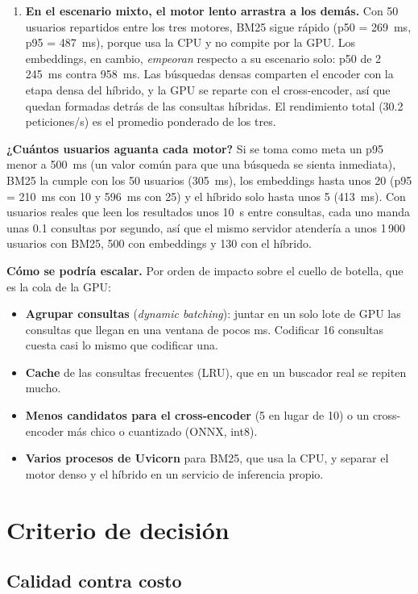 \documentclass[11pt,letterpaper]{article}
\begin{document}
\begin{enumerate}
\item \textbf{En el escenario mixto, el motor lento arrastra a los demás.} Con 50 usuarios repartidos entre los tres motores, BM25 sigue rápido (p50 = 269~ms, p95 = 487~ms), porque usa la CPU y no compite por la GPU. Los embeddings, en cambio, \emph{empeoran} respecto a su escenario solo: p50 de 2\,245~ms contra 958~ms. Las búsquedas densas comparten el encoder con la etapa densa del híbrido, y la GPU se reparte con el cross-encoder, así que quedan formadas detrás de las consultas híbridas. El rendimiento total (30.2 peticiones/s) es el promedio ponderado de los tres.
\end{enumerate}

\textbf{¿Cuántos usuarios aguanta cada motor?} Si se toma como meta un p95 menor a 500~ms (un valor común para que una búsqueda se sienta inmediata), BM25 la cumple con los 50 usuarios (305~ms), los embeddings hasta unos 20 (p95 = 210~ms con 10 y 596~ms con 25) y el híbrido solo hasta unos 5 (413~ms). Con usuarios reales que leen los resultados unos 10~s entre consultas, cada uno manda unas 0.1 consultas por segundo, así que el mismo servidor atendería a unos 1\,900 usuarios con BM25, 500 con embeddings y 130 con el híbrido.

\textbf{Cómo se podría escalar.} Por orden de impacto sobre el cuello de botella, que es la cola de la GPU:
\begin{itemize}[nosep]
\item \textbf{Agrupar consultas} (\emph{dynamic batching}): juntar en un solo lote de GPU las consultas que llegan en una ventana de pocos ms. Codificar 16 consultas cuesta casi lo mismo que codificar una.
\item \textbf{Cache} de las consultas frecuentes (LRU), que en un buscador real se repiten mucho.
\item \textbf{Menos candidatos para el cross-encoder} (5 en lugar de 10) o un cross-encoder más chico o cuantizado (ONNX, int8).
\item \textbf{Varios procesos de Uvicorn} para BM25, que usa la CPU, y separar el motor denso y el híbrido en un servicio de inferencia propio.
\end{itemize}

\section{Criterio de decisión}

\subsection{Calidad contra costo}
\end{document}
